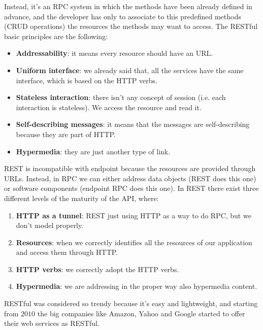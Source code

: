 Instead, it's an RPC system in which the methods have been already defined in advance, and the developer has only to associate to this predefined methods (CRUD operations) the resources the methods may want to access.
The RESTful basic principles are the following:
\begin{itemize}
    \item \textbf{Addressability}: it means every resource should have an URL.
    \item \textbf{Uniform interface}: we already said that, all the services have the same interface, which is based on the HTTP verbs.
    \item \textbf{Stateless interaction}: there isn't any concept of session (i.e. each interaction is stateless). We access the resource and read it.
    \item \textbf{Self-describing messages}: it means that the messages are self-describing because they are part of HTTP.
    \item \textbf{Hypermedia}: they are just another type of link.
\end{itemize}
REST is incompatible with endpoint because the resources are provided through URLs.
Instead, in RPC we can either address data objects (REST does this one) or software components (endpoint RPC does this one).
In REST there exist three different levels of the maturity of the API, where:
\begin{enumerate}
    \item \textbf{HTTP as a tunnel}: REST just using HTTP as a way to do RPC, but we don't model properly.
    \item \textbf{Resources}: when we correctly identifies all the resources of our application and access them through HTTP.
    \item \textbf{HTTP verbs}: we correctly adopt the HTTP verbs.
    \item \textbf{Hypermedia}: we are addressing in the proper way also hypermedia content.
\end{enumerate}
RESTful was considered so trendy because it's easy and lightweight, and starting from $2010$ the big companies like Amazon, Yahoo and Google started to offer their web services as RESTful.
